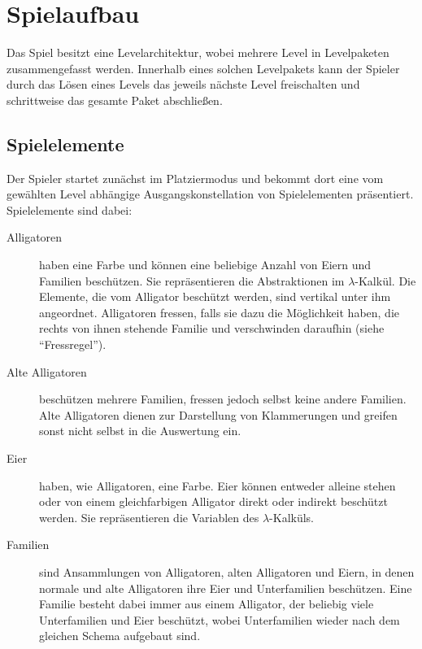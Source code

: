 \section{Spielaufbau}

Das Spiel besitzt eine Levelarchitektur, wobei mehrere Level in Levelpaketen zusammengefasst werden.
Innerhalb eines solchen Levelpakets kann der Spieler durch das Lösen eines Levels das jeweils nächste Level freischalten und schrittweise das gesamte Paket abschließen.

\subsection{Spielelemente}
Der Spieler startet zunächst im Platziermodus und bekommt dort eine vom gewählten Level abhängige Ausgangskonstellation von Spielelementen präsentiert. 
Spielelemente sind dabei:

        \begin{description}
                \item[Alligatoren] haben eine Farbe und können eine beliebige Anzahl von Eiern und Familien beschützen.
                Sie repräsentieren die Abstraktionen im \(\lambda\)-Kalkül.
                Die Elemente, die vom Alligator beschützt werden, sind vertikal unter ihm angeordnet.
                Alligatoren fressen, falls sie dazu die Möglichkeit haben, die rechts von ihnen stehende Familie und verschwinden daraufhin (siehe "`Fressregel"').

                \item[Alte Alligatoren] beschützen mehrere Familien, fressen jedoch selbst keine andere Familien.
                Alte Alligatoren dienen zur Darstellung von Klammerungen und greifen sonst nicht selbst in die Auswertung ein.

                \item[Eier] haben, wie Alligatoren, eine Farbe.
                Eier können entweder alleine stehen oder von einem gleichfarbigen Alligator direkt oder indirekt beschützt werden. Sie repräsentieren die Variablen des \(\lambda\)-Kalküls.

                \item[Familien] sind Ansammlungen von Alligatoren, alten Alligatoren und Eiern, in denen normale und alte Alligatoren ihre Eier und Unterfamilien beschützen.
                Eine Familie besteht dabei immer aus einem Alligator, der beliebig viele Unterfamilien und Eier beschützt, wobei Unterfamilien wieder nach dem gleichen Schema aufgebaut sind.

        \end{description}

